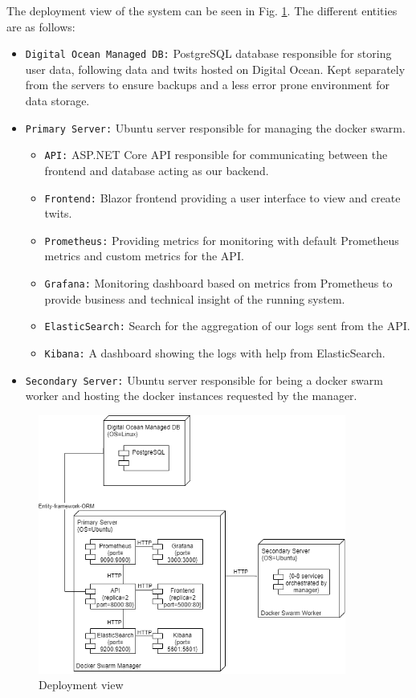 \documentclass[10pt]{article}
\begin{document}
The deployment view of the system can be seen in Fig. \ref{fig:deloy}. The different entities are as follows:

\begin{itemize}
    \item \texttt{Digital Ocean Managed DB:} PostgreSQL database responsible for storing user data, following data and twits hosted on Digital Ocean. Kept separately from the servers to ensure backups and a less error prone environment for data storage.
    \item \texttt{Primary Server:} Ubuntu server responsible for managing the docker swarm.
    \begin{itemize}
        \item \texttt{API:} ASP.NET Core API responsible for communicating between the frontend and database acting as our backend.
        \item \texttt{Frontend:} Blazor frontend providing a user interface to view and create twits.
        \item \texttt{Prometheus:} Providing metrics for monitoring with default Prometheus metrics and custom metrics for the API.
        \item \texttt{Grafana:} Monitoring dashboard based on metrics from Prometheus to provide business and technical insight of the running system.
        \item \texttt{ElasticSearch:} Search for the aggregation of our logs sent from the API. 
        \item \texttt{Kibana:} A dashboard showing the logs with help from ElasticSearch.
    \end{itemize}
    \item \texttt{Secondary Server:} Ubuntu server responsible for being a docker swarm worker and hosting the docker instances requested by the manager.
\end{itemize}

\begin{figure} [H]
  \centering
  \includegraphics[width=0.9\textwidth]{images/devops-deployment.png}
  \caption{Deployment view}
  \label{fig:deloy}
\end{figure}
\end{document}
